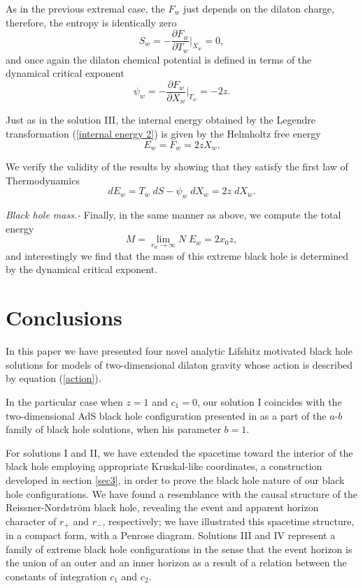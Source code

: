 \documentclass[sn-mathphys,Numbered]{sn-jnl}%
\theoremstyle{thmstyleone}%
\theoremstyle{thmstyletwo}%
\theoremstyle{thmstylethree}%
\begin{document}
As in the previous extremal case, the $F_w$ just depends on the dilaton charge, therefore, the entropy is identically zero
%
\begin{equation}\label{entropy IV}
    S_w=-\frac{\partial F_w}{\partial T_w}\bigg\rvert_{X_w}=0,
\end{equation}
%
and once again the dilaton chemical potential is defined in terms of the dynamical critical exponent
%
\begin{equation}\label{chemical potential IV}
    \psi_w=-\frac{\partial F_w}{\partial X_w}\bigg\rvert_{T_w}=-2z.
\end{equation}

Just as in the solution III, the internal energy obtained by the Legendre transformation (\ref{internal energy 2}) is given by the Helmholtz free energy
\begin{equation}
    E_w=F_w=2zX_w.
\end{equation}

We verify the validity of the results by showing that they satisfy the first law of Thermodynamics
%
\begin{equation}
    dE_w=T_w\;dS-\psi_w\;dX_w=2z\;dX_w.
\end{equation}

\textit{Black hole mass.-} Finally, in the same manner as above, we compute the total energy 
%
\begin{equation}
    M= \lim_{r_w \rightarrow \infty} N\; E_w =2x_0z,   
\end{equation}
and interestingly we find that the mass of this extreme black hole is determined by the dynamical critical exponent.

\section{Conclusions} \label{sec5}

In this paper we have presented four novel analytic Lifshitz motivated black hole solutions for models of two-dimensional dilaton gravity whose action is described by equation (\ref{action}).

In the particular case when $z=1$ and $c_1=0$, our solution I coincides with the two-dimensional AdS black hole configuration presented in \cite{Katanaev,Grumiller} as a part of the $a$-$b$ family of black hole solutions, when his parameter $b=1$.

For solutions I and II, we have extended the spacetime toward the interior of the black hole employing appropriate Kruskal-like coordinates, a construction developed in section \ref{sec3}, in order to prove the black hole nature of our black hole configurations. We have found a resemblance with the causal structure of the Reissner-Nordström black hole, revealing the event and apparent horizon character of $r_+$ and $r_-$, respectively; we have illustrated this spacetime structure, in a compact form, with a Penrose diagram. Solutions III and IV represent a family of extreme black hole configurations in the sense that the event horizon is the union of an outer and an inner horizon as a result of a relation between the constants of integration $c_1$ and $c_2$. 
\end{document}
